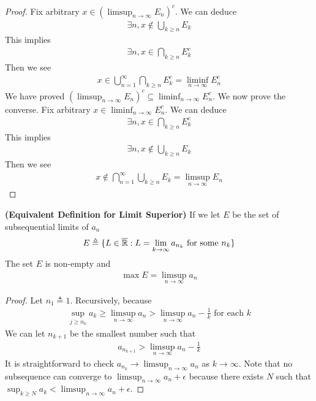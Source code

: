 \documentclass{report}
\begin{document}
\begin{proof}
Fix arbitrary $x\in (\limsup_{n\to\infty} E_n)^c$. We can deduce 
\begin{align*}
\exists n, x \not\in \bigcup_{k\geq n}E_k
\end{align*}
This implies 
\begin{align*}
\exists n, x\in \bigcap_{k\geq  n}E_k^c
\end{align*}
Then we see 
\begin{align*}
x \in \bigcup_{n=1}^{\infty} \bigcap_{k\geq n} E_k^c= \liminf_{n\to\infty} E_n^c
\end{align*}
We have proved $(\limsup_{n\to\infty} E_n)^c \subseteq \liminf_{n\to\infty} E_n^c$. We now prove the converse. Fix arbitrary $x\in \liminf_{n\to\infty} E_n^c$. We can deduce
\begin{align*}
\exists  n, x\in \bigcap_{k\geq n }E_k^c
\end{align*}
This implies 
\begin{align*}
\exists n, x\not\in \bigcup_{k\geq n}E_k
\end{align*}
Then we see 
\begin{align*}
x \not\in \bigcap_{n=1}^{\infty} \bigcup_{k\geq n }E_k = \limsup_{n\to\infty} E_n
\end{align*}
\end{proof}
\begin{theorem}
\textbf{(Equivalent Definition for Limit Superior)}
If we let $E$ be the set of subsequential limits of $a_n$
 \begin{align*}
E\triangleq \{ L\in\overline{\mathbb{R}}:L=\lim_{k\to \infty}a_{n_k}\text{ for some }n_k \}
\end{align*}
The set $E$ is non-empty and 
\begin{align*}
\max E=\limsup_{n\to\infty} a_n
\end{align*}
\end{theorem}
\begin{proof}
Let $n_1\triangleq 1$. Recursively, because
\begin{align*}
\sup_{j\geq n_k}a_k\geq \limsup_{n\to\infty} a_n>\limsup_{n\to\infty} a_n - \frac{1}{k}\text{ for each }k
\end{align*}
We can let $n_{k+1}$ be the smallest number such that 
\begin{align*}
a_{n_{k+1}}>\limsup_{n\to\infty} a_n - \frac{1}{k}
\end{align*}
It is straightforward to check $a_{n_k}\to \limsup_{n\to\infty} a_n$ as $k\to \infty$. Note that no subsequence can converge to $\limsup_{n\to\infty} a_n+\epsilon $ because there exists $N$ such that  $\sup_{k\geq N}a_k<\limsup_{n\to\infty} a_n+\epsilon $. 
\end{proof}
\end{document}
